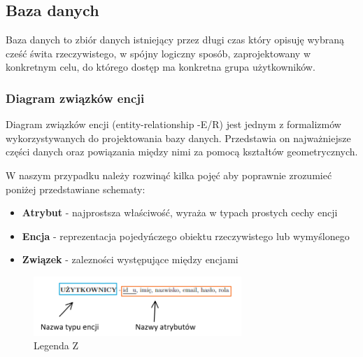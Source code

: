 \subsection{Baza danych}
Baza danych to zbiór danych istniejący przez długi czas który opisuję wybraną 
cześć świta rzeczywistego, w spójny logiczny sposób, zaprojektowany w konkretnym celu,
do którego dostęp ma konkretna grupa użytkowników. 
\subsubsection{Diagram związków encji}
Diagram związków encji (entity-relationship -E/R) jest jednym z formalizmów 
wykorzystywanych do projektowania bazy danych. Przedstawia on najważniejsze
części danych oraz powiązania między nimi za pomocą kształtów geometrycznych. 



W naszym przypadku należy rozwinąć kilka pojęć aby poprawnie zrozumieć
poniżej przedstawiane schematy:
\begin{itemize}
    \item \textbf{Atrybut} - najprostsza właściwość, wyraża w typach prostych cechy encji 
    \item \textbf{Encja} - reprezentacja pojedyńczego obiektu rzeczywistego lub wymyślonego
    \item \textbf{Związek} - zalezności występujące między encjami
\end{itemize}


\begin{figure}[htbp]
    \centering
    \includegraphics[width=0.7\textwidth]{Rozdziały/Opis zaprojektowanego systemu/Podrozdziały/LegendaODL.png}  %
    \caption{Legenda Z}  %
    \label{fig:nazwa_etkiety}  %
\end{figure}




